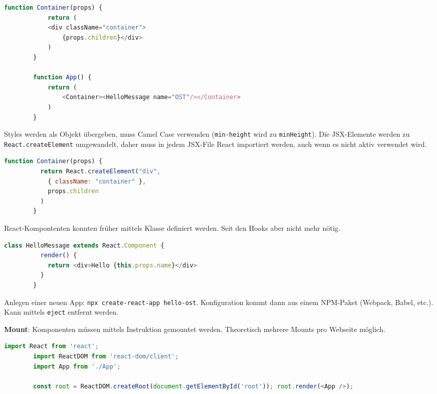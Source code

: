 \documentclass[10pt,landscape]{article}
\begin{document}
\begin{multicols}{2}
        \begin{lstlisting}[language=JavaScript]
        function Container(props) {
            return (
            <div className="container">
                {props.children}</div>
            )
        }

        function App() {
            return (
                <Container><HelloMessage name="OST"/></Container>
            )
        }
        \end{lstlisting}

        Styles werden als Objekt übergeben, muss Camel Case verwenden (\lstinline{min-height} wird zu \lstinline{minHeight}).
        Die JSX-Elemente werden zu \lstinline{React.createElement} umgewandelt, daher muss in jedem JSX-File React importiert werden, auch wenn es nicht aktiv verwendet wird.

        \begin{lstlisting}[language=JavaScript]
        function Container(props) {
          return React.createElement("div",
            { className: "container" },
            props.children
          )
        }
        \end{lstlisting}

        React-Kompontenten konnten früher mittels Klasse definiert werden.
        Seit den Hooks aber nicht mehr nötig.

        \begin{lstlisting}[language=JavaScript]
        class HelloMessage extends React.Component {
          render() {
            return <div>Hello {this.props.name}</div>
          }
        }
        \end{lstlisting}

        Anlegen einer neuen App: \lstinline{npx create-react-app hello-ost}.
        Konfiguration kommt dann aus einem NPM-Paket (Webpack, Babel, etc.).
        Kann mittels \lstinline{eject} entfernt werden.

        \textbf{Mount}: Komponenten müssen mittels Instruktion gemountet werden.
        Theoretisch mehrere Mounts pro Webseite möglich.

        \begin{lstlisting}[language=JavaScript]
        import React from 'react';
        import ReactDOM from 'react-dom/client';
        import App from './App';

        const root = ReactDOM.createRoot(document.getElementById('root')); root.render(<App />);
        \end{lstlisting}


\end{multicols}
\end{document}
